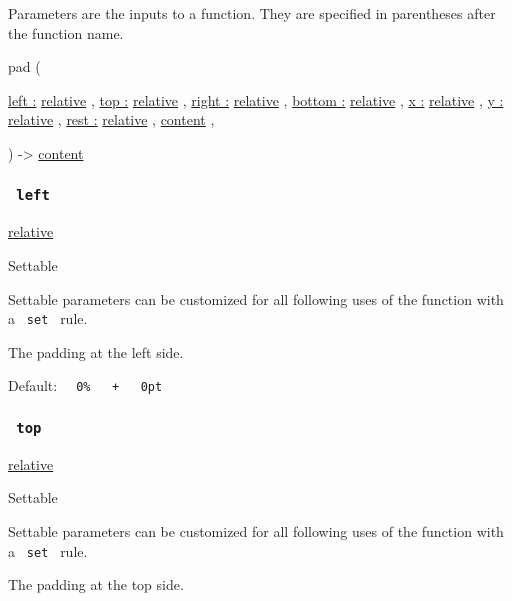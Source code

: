 \label{parameters-tooltip}
Parameters are the inputs to a function. They are specified in
parentheses after the function name.

{ pad } (

{ \hyperref[parameters-left]{left :}
\href{/docs/reference/layout/relative/}{relative} , } {
\hyperref[parameters-top]{top :}
\href{/docs/reference/layout/relative/}{relative} , } {
\hyperref[parameters-right]{right :}
\href{/docs/reference/layout/relative/}{relative} , } {
\hyperref[parameters-bottom]{bottom :}
\href{/docs/reference/layout/relative/}{relative} , } {
\hyperref[parameters-x]{x :}
\href{/docs/reference/layout/relative/}{relative} , } {
\hyperref[parameters-y]{y :}
\href{/docs/reference/layout/relative/}{relative} , } {
\hyperref[parameters-rest]{rest :}
\href{/docs/reference/layout/relative/}{relative} , } {
\href{/docs/reference/foundations/content/}{content} , }

) -\textgreater{} \href{/docs/reference/foundations/content/}{content}

\subsubsection{\texorpdfstring{\texttt{\ left\ }}{ left }}\label{parameters-left}

\href{/docs/reference/layout/relative/}{relative}

{{ Settable }}

\label{parameters-left-settable-tooltip}
Settable parameters can be customized for all following uses of the
function with a \texttt{\ set\ } rule.

The padding at the left side.

Default:
\texttt{\ }{\texttt{\ 0\%\ }}\texttt{\ }{\texttt{\ +\ }}\texttt{\ }{\texttt{\ 0pt\ }}\texttt{\ }

\subsubsection{\texorpdfstring{\texttt{\ top\ }}{ top }}\label{parameters-top}

\href{/docs/reference/layout/relative/}{relative}

{{ Settable }}

\label{parameters-top-settable-tooltip}
Settable parameters can be customized for all following uses of the
function with a \texttt{\ set\ } rule.

The padding at the top side.

